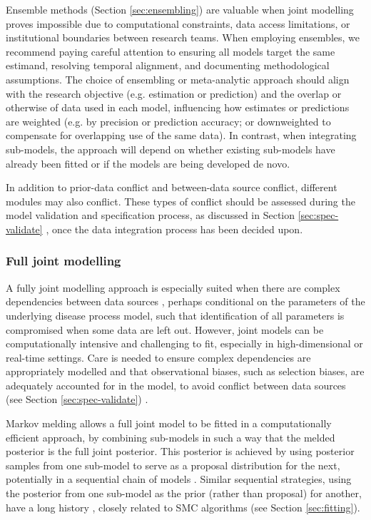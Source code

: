 \documentclass{article}
\begin{document}
Ensemble methods (Section \ref{sec:ensembling}) are valuable when joint modelling proves impossible due to computational constraints, data access limitations, or institutional boundaries between research teams.
When employing ensembles, we recommend paying careful attention to ensuring all models target the same estimand, resolving temporal alignment, and documenting methodological assumptions. The choice of ensembling or meta-analytic approach should align with the research objective (e.g. estimation or prediction) and the overlap or otherwise of data used in each model, influencing how estimates or predictions are weighted (e.g. by precision or prediction accuracy; or downweighted to compensate for overlapping use of the same data). In contrast, when integrating sub-models, the approach will depend on whether existing sub-models have already been fitted or if the models are being developed de novo.

In addition to prior-data conflict and between-data source conflict, different modules may also conflict. These types of conflict should be assessed during the model validation and specification process, as discussed in Section \ref{sec:spec-validate} \citep{presanis2013conflict,sherratt2021exploring,yang2025detecting}, once the data integration process has been decided upon.

\subsubsection{Full joint modelling}\label{sec:joint}

A fully joint modelling approach is especially suited when there are complex dependencies between data sources \citep{corbella2022inferring}, perhaps conditional on the parameters of the underlying disease process model, such that identification of all parameters is compromised when some data are left out. However, joint models can be computationally intensive and challenging to fit, especially in high-dimensional or real-time settings. Care is needed to ensure complex dependencies are appropriately modelled and that observational biases, such as selection biases, are adequately accounted for in the model, to avoid conflict between data sources (see
Section \ref{sec:spec-validate}) \citep{presanis2013conflict,corbella2022inferring}. 

Markov melding \citep{goudie2019joining} allows a full joint model to be fitted in a computationally efficient approach, by combining sub-models in such a way that the melded posterior is the full joint posterior. This posterior is achieved by using posterior samples from one sub-model to serve as a proposal distribution for the next, potentially in a sequential chain of models \citep{manderson2023combining}. Similar sequential strategies, using the posterior from one sub-model as the prior (rather than proposal) for another, have a long history \citep{west1997bayesian}, closely related to \ac{SMC} algorithms \citep{doucet2001introduction} (see Section \ref{sec:fitting}).
\end{document}
